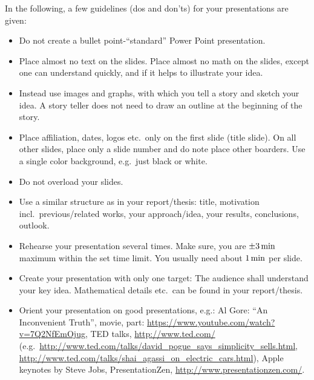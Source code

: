 \documentclass[journal]{IEEEtran}
\begin{document}
In the following, a few guidelines (dos and don'ts) for your presentations are given:

\begin{itemize}
	\item Do not create a bullet point-“standard” Power Point presentation.
	\item Place almost no text on the slides. Place almost no math on the slides, except one can understand quickly, and if it helps to illustrate your idea.
	\item Instead use images and graphs, with which you tell a story and sketch your idea. A story teller does not need to draw an outline at the beginning of the story.
	\item Place affiliation, dates, logos etc.\ only on the first slide (title slide). On all other slides, place only a slide number and do note place other boarders. Use a single color background, e.g.\ just black or white.
	\item Do not overload your slides.
	\item Use a similar structure as in your report/thesis: title, motivation incl.\ previous/related works, your approach/idea, your results, conclusions, outlook.
	\item Rehearse your presentation several times. Make sure, you are $\unit[\pm 3]{min}$ maximum within the set time limit. You usually need about $\unit[1]{min}$ per slide.
	\item Create your presentation with only one target: The audience shall understand your key idea. Mathematical details etc.\ can be found in your report/thesis.
	\item Orient your presentation on good presentations, e.g.: Al Gore: “An Inconvenient Truth”, movie, part: \url{https://www.youtube.com/watch?v=7Q2NfEmOjug}, TED talks, \url{http://www.ted.com/} (e.g.\ \url{http://www.ted.com/talks/david_pogue_says_simplicity_sells.html}, \url{http://www.ted.com/talks/shai_agassi_on_electric_cars.html}), Apple keynotes by Steve Jobs, PresentationZen, \url{http://www.presentationzen.com/}.
\end{itemize}





\end{document}
